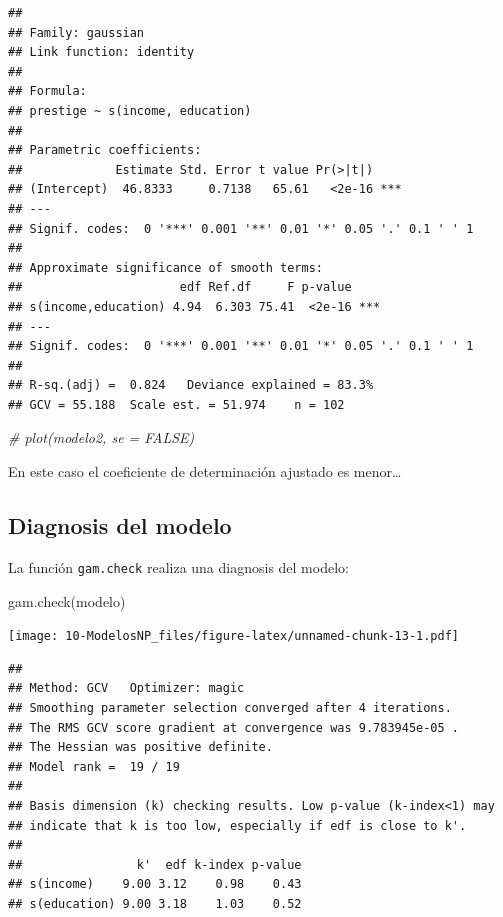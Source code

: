\documentclass[
]{book}
\newenvironment{Shaded}{\begin{snugshade}}{\end{snugshade}}
\newcommand{\CommentTok}[1]{\textcolor[rgb]{0.56,0.35,0.01}{\textit{#1}}}
\newcommand{\FunctionTok}[1]{\textcolor[rgb]{0.00,0.00,0.00}{#1}}
\newcommand{\NormalTok}[1]{#1}
\theoremstyle{break}
\theoremstyle{nonumberplain}
\begin{document}
\begin{verbatim}
## 
## Family: gaussian 
## Link function: identity 
## 
## Formula:
## prestige ~ s(income, education)
## 
## Parametric coefficients:
##             Estimate Std. Error t value Pr(>|t|)    
## (Intercept)  46.8333     0.7138   65.61   <2e-16 ***
## ---
## Signif. codes:  0 '***' 0.001 '**' 0.01 '*' 0.05 '.' 0.1 ' ' 1
## 
## Approximate significance of smooth terms:
##                      edf Ref.df     F p-value    
## s(income,education) 4.94  6.303 75.41  <2e-16 ***
## ---
## Signif. codes:  0 '***' 0.001 '**' 0.01 '*' 0.05 '.' 0.1 ' ' 1
## 
## R-sq.(adj) =  0.824   Deviance explained = 83.3%
## GCV = 55.188  Scale est. = 51.974    n = 102
\end{verbatim}

\begin{Shaded}
\begin{Highlighting}[]
\CommentTok{\# plot(modelo2, se = FALSE)}
\end{Highlighting}
\end{Shaded}

En este caso el coeficiente de determinación ajustado es menor\ldots{}

\hypertarget{diagnosis-del-modelo-2}{%
\subsection{Diagnosis del modelo}\label{diagnosis-del-modelo-2}}

La función \texttt{gam.check} realiza una diagnosis del modelo:

\begin{Shaded}
\begin{Highlighting}[]
\FunctionTok{gam.check}\NormalTok{(modelo)}
\end{Highlighting}
\end{Shaded}

\texttt{[image: 10-ModelosNP\_files/figure-latex/unnamed-chunk-13-1.pdf]}

\begin{verbatim}
## 
## Method: GCV   Optimizer: magic
## Smoothing parameter selection converged after 4 iterations.
## The RMS GCV score gradient at convergence was 9.783945e-05 .
## The Hessian was positive definite.
## Model rank =  19 / 19 
## 
## Basis dimension (k) checking results. Low p-value (k-index<1) may
## indicate that k is too low, especially if edf is close to k'.
## 
##                k'  edf k-index p-value
## s(income)    9.00 3.12    0.98    0.43
## s(education) 9.00 3.18    1.03    0.52
\end{verbatim}
\end{document}
